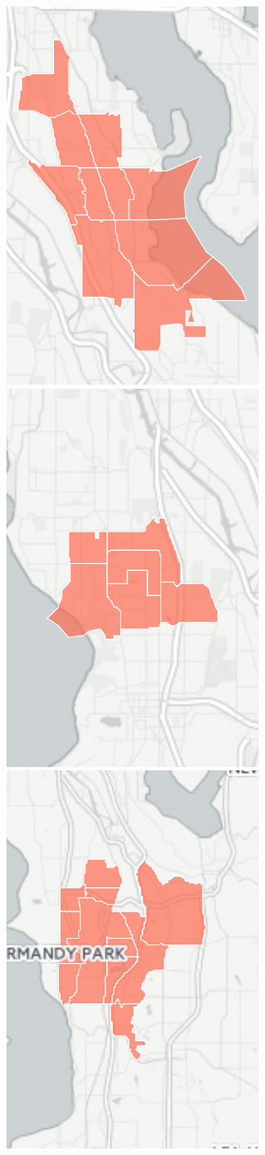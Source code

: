 \documentclass[]{article}
\begin{document}
\includegraphics{tracts_files/figure-latex/unnamed-chunk-2-1.pdf}
\includegraphics{tracts_files/figure-latex/unnamed-chunk-2-2.pdf}
\includegraphics{tracts_files/figure-latex/unnamed-chunk-2-3.pdf}
\end{document}
